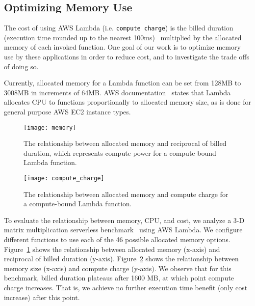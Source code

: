 \subsection{Optimizing Memory Use}

The cost of using AWS Lambda (i.e. \texttt{compute charge}) 
is the billed duration (execution time rounded up to the
nearest 100ms)~\cite{ref:pricing}
multiplied by the allocated memory of each invoked function.
One goal of our work is to optimize memory use by these
applications in order to reduce cost, and to investigate
the trade offs of doing so.

Currently, allocated memory for a Lambda function can be set
from 128MB to 3008MB in increments of 64MB.
AWS documentation~\cite{ref:lambdalimits}
states that Lambda allocates CPU to functions proportionally to allocated memory size,
as is done for general purpose AWS EC2 instance types.

\begin{figure}[t] \centering 
\texttt{[image: memory]}
\caption{The relationship between allocated memory and reciprocal of billed duration, which represents compute power for a compute-bound Lambda function.
\label{fig:memory}}
\end{figure}

\begin{figure}[t] \centering 
\texttt{[image: compute\_charge]}
\caption{The relationship between allocated memory and compute charge for a compute-bound Lambda function.
\label{fig:compute_charge}}
\end{figure}


To evaluate the relationship between memory, CPU, and cost, 
we analyze a 3-D matrix multiplication serverless benchmark~\cite{ref:matrix} using AWS Lambda.
We configure different functions to use each of the 46 possible allocated memory 
options.  Figure~\ref{fig:memory} shows the relationship between allocated memory 
(x-axis) and reciprocal of billed duration (y-axis). 
Figure~\ref{fig:compute_charge} shows the relationship between memory 
size (x-axis) and compute charge (y-axis). 
We observe that for this benchmark, billed duration 
plateaus after 1600 MB, at which point compute charge increases.
That is, we achieve no further execution time benefit (only cost increase)
after this point.

